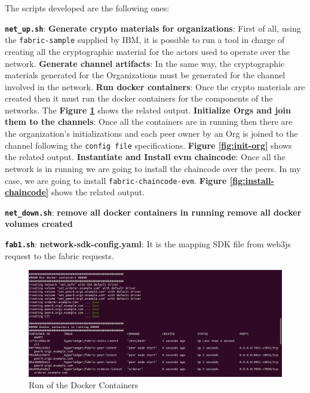 The scripts developed are the following ones:

\begin{outline}
    \1 \textbf{\texttt{net\_up.sh}}:
    \2 \textbf{Generate crypto materials for organizations}: First of all, using the \texttt{fabric-sample} supplied
    by IBM, it is possible to run a tool in charge of creating all the cryptographic material for the actors 
    used to operate over the network. 
    \2 \textbf{Generate channel artifacts}: In the same way, the cryptographic materials generated for the 
    Organizations must be generated for the channel involved in the network.
    \2 \textbf{Run docker containers}: Once the crypto materials are created then it must run the docker containers
    for the components of the networks. The \textbf{Figure \ref{fig:docker-run}} shows the related output.
    \2 \textbf{Initialize Orgs and join them to the channels}: Once all the containers are in running then there are
    the organization's initializations and each peer owner by an Org is joined to the channel following
    the \texttt{config file} specifications. \textbf{Figure \ref{fig:init-org}} shows the related output.
    \2 \textbf{Instantiate and Install evm chaincode}: Once all the network is in running we are going to install 
    the chaincode over the peers. In my case, we are going to install \texttt{fabric-chaincode-evm}.
    \textbf{Figure \ref{fig:install-chaincode}} shows the related output.

    \1 \textbf{\texttt{net\_down.sh}}:
    \2 \textbf{remove all docker containers in running}
    \2 \textbf{remove all docker volumes created}

    \1 \textbf{\texttt{fab1.sh}}:
    \2 \textbf{network-sdk-config.yaml}: It is the mapping SDK file from web3js request to the fabric requests. 

\end{outline}

\begin{figure}[!ht]
    \centering
    \includegraphics[totalheight=6cm]{img/network/net-1.png}
    \caption{Run of the Docker Containers}
    \label{fig:docker-run}
\end{figure}

